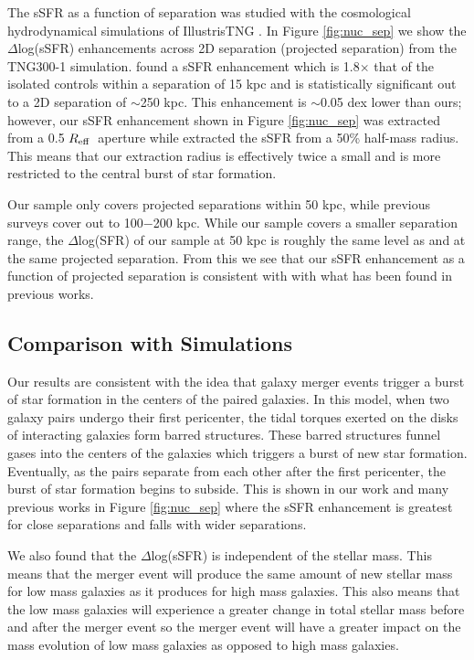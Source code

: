 \documentclass[apj,twocolumn]{emulateapj}
\newcommand{\reff}{$R_{\rm eff}$}
\begin{document}
\begin{CJK*}{UTF8}{gbsn}
The sSFR as a function of separation was studied with the cosmological hydrodynamical simulations of IllustrisTNG \citep{Patton:2020}. In Figure \ref{fig:nuc_sep} we show the $\Delta$log(sSFR) enhancements across 2D separation (projected separation) from the TNG300-1 simulation. \citet{Patton:2020} found a sSFR enhancement which is 1.8$\times$ that of the isolated controls within a separation of 15 kpc and is statistically significant out to a 2D separation of $\sim$250 kpc. This enhancement is $\sim$0.05 dex lower than ours; however, our sSFR enhancement shown in Figure \ref{fig:nuc_sep} was extracted from a 0.5 \reff\ aperture while \citet{Patton:2020} extracted the sSFR from a 50\% half-mass radius. This means that our extraction radius is effectively twice a small and is more restricted to the central burst of star formation. 

Our sample only covers projected separations within 50 kpc, while previous surveys cover out to 100$-$200 kpc. While our sample covers a smaller separation range, the $\Delta$log(SFR) of our sample at 50 kpc is roughly the same level as \citet{Ellison:2008} and \citet{Bustamante:2020} at the same projected separation. From this we see that our sSFR enhancement as a function of projected separation is consistent with with what has been found in previous works. 

\subsection{Comparison with Simulations}

Our results are consistent with the idea that galaxy merger events trigger a burst of star formation in the centers of the paired galaxies. In this model, when two galaxy pairs undergo their first pericenter, the tidal torques exerted on the disks of interacting galaxies form barred structures. These barred structures funnel gases into the centers of the galaxies which triggers a burst of new star formation. Eventually, as the pairs separate from each other after the first pericenter, the burst of star formation begins to subside. This is shown in our work and many previous works in Figure \ref{fig:nuc_sep} where the sSFR enhancement is greatest for close separations and falls with wider separations. 


We also found that the $\Delta$log(sSFR) is independent of the stellar mass. This means that the merger event will produce the same amount of new stellar mass for low mass galaxies as it produces for high mass galaxies. This also means that the low mass galaxies will experience a greater change in total stellar mass before and after the merger event so the merger event will have a greater impact on the mass evolution of low mass galaxies as opposed to high mass galaxies.


\end{CJK*}
\end{document}
